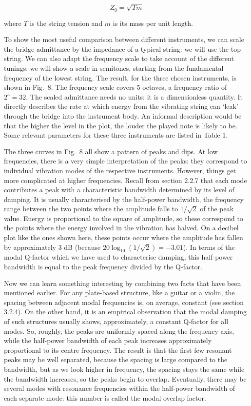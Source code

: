   $$Z_0=\sqrt{T m}$$ 

  where $T$ is the string tension and $m$ is its mass per unit length. 

  To show the most useful comparison between different instruments, we can 
  scale the bridge admittance by the impedance of a typical string: we will use 
  the top string. We can also adapt the frequency scale to take account of the 
  different tunings: we will show a scale in semitones, starting from the 
  fundamental frequency of the lowest string. The result, for the three chosen 
  instruments, is shown in Fig.\ 8. The frequency scale covers 5 octaves, a 
  frequency ratio of $2^5=32$. The scaled admittance needs no units: it is a 
  dimensionless quantity. It directly describes the rate at which energy from 
  the vibrating string can `leak' through the bridge into the instrument body. 
  An informal description would be that the higher the level in the plot, the 
  louder the played note is likely to be. Some relevant parameters for these 
  three instruments are listed in Table 1. 

  The three curves in Fig.\ 8 all show a pattern of peaks and dips. At low 
  frequencies, there is a very simple interpretation of the peaks: they 
  correspond to individual vibration modes of the respective instruments. 
  However, things get more complicated at higher frequencies. Recall from 
  section 2.2.7 that each mode contributes a peak with a characteristic 
  bandwidth determined by its level of damping. It is usually characterised by 
  the half-power bandwidth, the frequency range between the two points where 
  the amplitude falls to $1/\sqrt{2}$ of the peak value. Energy is proportional 
  to the square of amplitude, so these correspond to the points where the 
  energy involved in the vibration has halved. On a decibel plot like the ones 
  shown here, these points occur where the amplitude has fallen by 
  approximately 3 dB (because $20 \log_{10} (1/\sqrt{2}) = -3.01$). In terms of 
  the modal Q-factor which we have used to characterise damping, this 
  half-power bandwidth is equal to the peak frequency divided by the Q-factor. 

  Now we can learn something interesting by combining two facts that have been 
  mentioned earlier. For any plate-based structure, like a guitar or a violin, 
  the spacing between adjacent modal frequencies is, on average, constant (see 
  section 3.2.4). On the other hand, it is an empirical observation that the 
  modal damping of such structures usually shows, approximately, a constant 
  Q-factor for all modes. So, roughly, the peaks are uniformly spaced along the 
  frequency axis, while the half-power bandwidth of each peak increases 
  approximately proportional to its centre frequency. The result is that the 
  first few resonant peaks may be well separated, because the spacing is large 
  compared to the bandwidth, but as we look higher in frequency, the spacing 
  stays the same while the bandwidth increases, so the peaks begin to overlap. 
  Eventually, there may be several modes with resonance frequencies within the 
  half-power bandwidth of each separate mode: this number is called the modal 
  overlap factor. 

